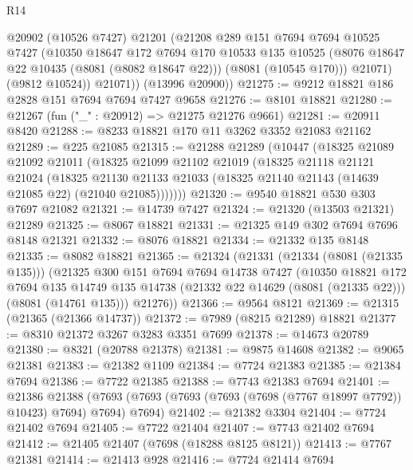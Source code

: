 \begin{lexlean}{R14}
\begin{coremodule}
            @20902
            (@10526 @7427)
            @21201
            (@21208
              @289
              @151
              @7694
              @7694
              @10525
              @7427
              (@10350
                @18647
                @172
                @7694
                @170
                @10533
                @135
                @10525
                (@8076 @18647 @22 @10435 (@8081 (@8082 @18647 @22)))
                (@8081 (@10545 @170)))
              @21071)
            (@9812 @10524))
          @21071))
      (@13996 @20900))
@21275 := @9212 @18821 @186 @2828 @151 @7694 @7694 @7427 @9658
@21276 := @8101 @18821
@21280 := @21267 (fun ("_" : @20912) => @21275 @21276 @9661)
@21281 := @20911 @8420
@21288 := @8233 @18821 @170 @11 @3262 @3352 @21083 @21162
@21289 := @225 @21085
@21315 := @21288
    @21289
    (@10447
      (@18325
        @21089
        @21092
        @21011
        (@18325
          @21099
          @21102
          @21019
          (@18325
            @21118
            @21121
            @21024
            (@18325
              @21130
              @21133
              @21033
              (@18325 @21140 @21143 (@14639 @21085 @22) (@21040 @21085)))))))
@21320 := @9540 @18821 @530 @303 @7697 @21082
@21321 := @14739 @7427
@21324 := @21320 (@13503 @21321) @21289
@21325 := @8067 @18821
@21331 := @21325 @149 @302 @7694 @7696 @8148 @21321
@21332 := @8076 @18821
@21334 := @21332 @135 @8148
@21335 := @8082 @18821
@21365 := @21324
    (@21331
      (@21334 (@8081 (@21335 @135)))
      (@21325
        @300
        @151
        @7694
        @7694
        @14738
        @7427
        (@10350
          @18821
          @172
          @7694
          @135
          @14749
          @135
          @14738
          (@21332 @22 @14629 (@8081 (@21335 @22)))
          (@8081 (@14761 @135)))
        @21276))
@21366 := @9564 @8121
@21369 := @21315 (@21365 (@21366 @14737))
@21372 := @7989 (@8215 @21289) @18821
@21377 := @8310 @21372 @3267 @3283 @3351 @7699
@21378 := @14673 @20789
@21380 := @8321 (@20788 @21378)
@21381 := @9875 @14608
@21382 := @9065 @21381
@21383 := @21382 @1109
@21384 := @7724 @21383
@21385 := @21384 @7694
@21386 := @7722 @21385
@21388 := @7743 @21383 @7694
@21401 := @21386
    @21388
    (@7693 (@7693 (@7693 (@7693 (@7698 (@7767 @18997 @7792)) @10423) @7694) @7694) @7694)
@21402 := @21382 @3304
@21404 := @7724 @21402 @7694
@21405 := @7722 @21404
@21407 := @7743 @21402 @7694
@21412 := @21405 @21407 (@7698 (@18288 @8125 @8121))
@21413 := @7767 @21381
@21414 := @21413 @928
@21416 := @7724 @21414 @7694

\end{coremodule}
\end{lexlean}
